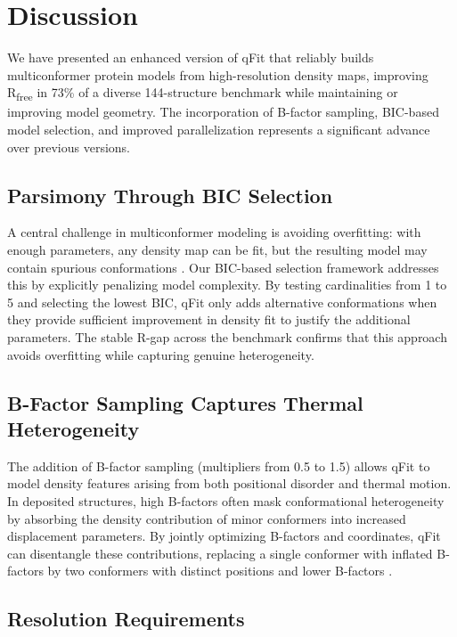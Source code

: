 \documentclass[12pt]{article}
\begin{document}
\section{Discussion}

We have presented an enhanced version of qFit that reliably builds multiconformer protein models from high-resolution density maps, improving R\textsubscript{free} in 73\% of a diverse 144-structure benchmark while maintaining or improving model geometry. The incorporation of B-factor sampling, BIC-based model selection, and improved parallelization represents a significant advance over previous versions.

\subsection{Parsimony Through BIC Selection}

A central challenge in multiconformer modeling is avoiding overfitting: with enough parameters, any density map can be fit, but the resulting model may contain spurious conformations \citep{fenwick2014understanding}. Our BIC-based selection framework addresses this by explicitly penalizing model complexity. By testing cardinalities from 1 to 5 and selecting the lowest BIC, qFit only adds alternative conformations when they provide sufficient improvement in density fit to justify the additional parameters. The stable R-gap across the benchmark confirms that this approach avoids overfitting while capturing genuine heterogeneity.

\subsection{B-Factor Sampling Captures Thermal Heterogeneity}

The addition of B-factor sampling (multipliers from 0.5 to 1.5) allows qFit to model density features arising from both positional disorder and thermal motion. In deposited structures, high B-factors often mask conformational heterogeneity by absorbing the density contribution of minor conformers into increased displacement parameters. By jointly optimizing B-factors and coordinates, qFit can disentangle these contributions, replacing a single conformer with inflated B-factors by two conformers with distinct positions and lower B-factors \citep{wall2014conformational}.

\subsection{Resolution Requirements}
\end{document}
